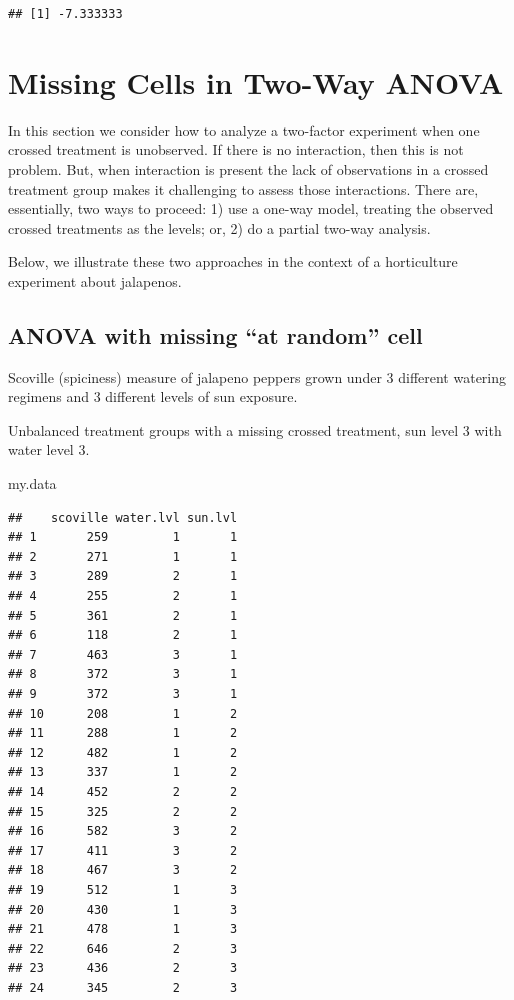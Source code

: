 \documentclass[
]{book}
\newenvironment{Shaded}{\begin{snugshade}}{\end{snugshade}}
\newcommand{\NormalTok}[1]{#1}
\begin{document}
\begin{verbatim}
## [1] -7.333333
\end{verbatim}

\hypertarget{missing-cells-in-two-way-anova}{%
\chapter{Missing Cells in Two-Way ANOVA}\label{missing-cells-in-two-way-anova}}

In this section we consider how to analyze a two-factor experiment when one crossed treatment is unobserved. If there is no interaction, then this is not problem. But, when interaction is present the lack of observations in a crossed treatment group makes it challenging to assess those interactions. There are, essentially, two ways to proceed: 1) use a one-way model, treating the observed crossed treatments as the levels; or, 2) do a partial two-way analysis.

Below, we illustrate these two approaches in the context of a horticulture experiment about jalapenos.

\hypertarget{anova-with-missing-at-random-cell}{%
\section{ANOVA with missing ``at random'' cell}\label{anova-with-missing-at-random-cell}}

Scoville (spiciness) measure of jalapeno peppers grown under 3 different watering regimens and 3 different levels of sun exposure.

Unbalanced treatment groups with a missing crossed treatment, sun level 3 with water level 3.

\begin{Shaded}
\begin{Highlighting}[]
\NormalTok{my.data}
\end{Highlighting}
\end{Shaded}

\begin{verbatim}
##    scoville water.lvl sun.lvl
## 1       259         1       1
## 2       271         1       1
## 3       289         2       1
## 4       255         2       1
## 5       361         2       1
## 6       118         2       1
## 7       463         3       1
## 8       372         3       1
## 9       372         3       1
## 10      208         1       2
## 11      288         1       2
## 12      482         1       2
## 13      337         1       2
## 14      452         2       2
## 15      325         2       2
## 16      582         3       2
## 17      411         3       2
## 18      467         3       2
## 19      512         1       3
## 20      430         1       3
## 21      478         1       3
## 22      646         2       3
## 23      436         2       3
## 24      345         2       3
\end{verbatim}
\end{document}
